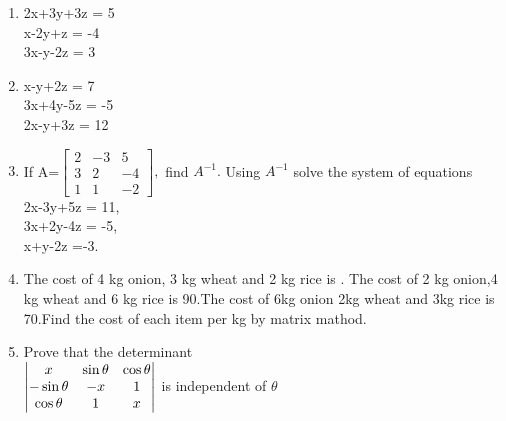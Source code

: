 \documentclass[journal,12pt,twocolumn]{IEEEtran}
\renewcommand\thesection{\arabic{section}}
\begin{document}
\begin{enumerate}[label=\thesection.\arabic*.,ref=\thesection.\theenumi]
\item 2x+3y+3z = 5 \\ x-2y+z = -4 \\ 3x-y-2z = 3\\
\item x-y+2z = 7 \\ 3x+4y-5z = -5 \\ 2x-y+3z = 12\\ 
\item If A=$\begin{bmatrix}
2&-3&5 \\ 3&2&-4 \\ 1&1&-2
\end{bmatrix},$ find $A^{-1}.$ Using $A^{-1}$ solve the system of equations \\
2x-3y+5z = 11, \\ 3x+2y-4z = -5, \\ x+y-2z =-3.\\
\item The cost of 4 kg onion, 3 kg wheat and 2 kg rice is . The cost of 2 kg onion,4 kg wheat and 6 kg rice is \rupee 90.The cost of 6kg onion 2kg wheat and 3kg rice is \rupee 70.Find the cost of each item per kg by matrix mathod. 
\item Prove that the determinant \\
$\begin{vmatrix}
x &\sin\theta&\cos\theta \\ -\sin\theta&-x&1 \\ \cos\theta&1&x
\end{vmatrix}$ 
is independent of $\theta$
\\
\solution 
%


\end{enumerate}
\end{document}
